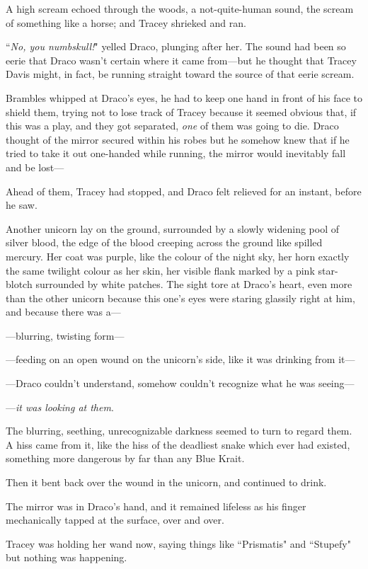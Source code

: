 A high scream echoed through the woods, a not-quite-human sound, the scream of something like a horse; and Tracey shrieked and ran.

``\emph{No, you numbskull!}" yelled Draco, plunging after her. The sound had been so eerie that Draco wasn't certain where it came from—but he thought that Tracey Davis might, in fact, be running straight toward the source of that eerie scream.

Brambles whipped at Draco's eyes, he had to keep one hand in front of his face to shield them, trying not to lose track of Tracey because it seemed obvious that, if this was a play, and they got separated, \emph{one} of them was going to die. Draco thought of the mirror secured within his robes but he somehow knew that if he tried to take it out one-handed while running, the mirror would inevitably fall and be lost—

Ahead of them, Tracey had stopped, and Draco felt relieved for an instant, before he saw.

Another unicorn lay on the ground, surrounded by a slowly widening pool of silver blood, the edge of the blood creeping across the ground like spilled mercury. Her coat was purple, like the colour of the night sky, her horn exactly the same twilight colour as her skin, her visible flank marked by a pink star-blotch surrounded by white patches. The sight tore at Draco's heart, even more than the other unicorn because this one's eyes were staring glassily right at him, and because there was a—

—blurring, twisting form—

—feeding on an open wound on the unicorn's side, like it was drinking from it—

—Draco couldn't understand, somehow couldn't recognize what he was seeing—

—\emph{it was looking at them}.

The blurring, seething, unrecognizable darkness seemed to turn to regard them. A hiss came from it, like the hiss of the deadliest snake which ever had existed, something more dangerous by far than any Blue Krait.

Then it bent back over the wound in the unicorn, and continued to drink.

The mirror was in Draco's hand, and it remained lifeless as his finger mechanically tapped at the surface, over and over.

Tracey was holding her wand now, saying things like ``Prismatis" and ``Stupefy" but nothing was happening.

